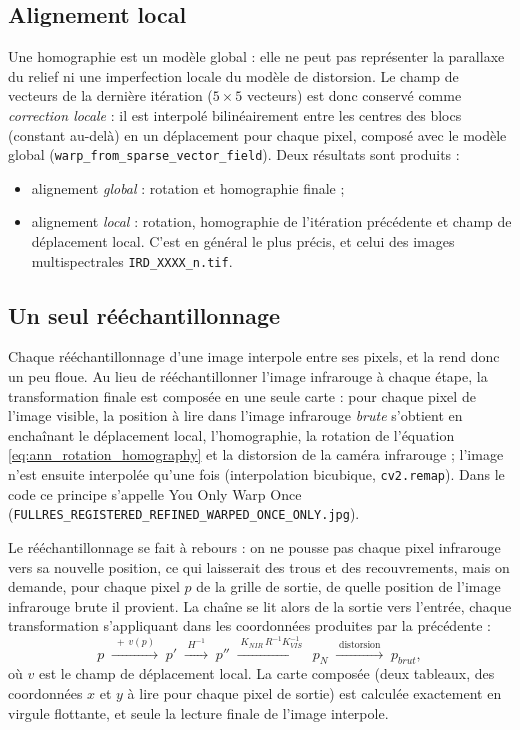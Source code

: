 \documentclass[a4paper,11pt]{report}
\begin{document}
\subsection{Alignement local}\label{sec:ann_local}
Une homographie est un modèle global : elle ne peut pas représenter la parallaxe du relief ni une imperfection locale du modèle de distorsion. Le champ de vecteurs de la dernière itération ($5 \times 5$ vecteurs) est donc conservé comme \emph{correction locale} : il est interpolé bilinéairement entre les centres des blocs (constant au-delà) en un déplacement pour chaque pixel, composé avec le modèle global (\texttt{warp\_from\_sparse\_vector\_field}). Deux résultats sont produits :
\begin{itemize}
	\item alignement \emph{global} : rotation et homographie finale ;
	\item alignement \emph{local} : rotation, homographie de l'itération précédente et champ de déplacement local. C'est en général le plus précis, et celui des images multispectrales \texttt{IRD\_XXXX\_n.tif}.
\end{itemize}

\subsection{Un seul rééchantillonnage}
Chaque rééchantillonnage d'une image interpole entre ses pixels, et la rend donc un peu floue. Au lieu de rééchantillonner l'image infrarouge à chaque étape, la transformation finale est composée en une seule carte : pour chaque pixel de l'image visible, la position à lire dans l'image infrarouge \emph{brute} s'obtient en enchaînant le déplacement local, l'homographie, la rotation de l'équation \eqref{eq:ann_rotation_homography} et la distorsion de la caméra infrarouge ; l'image n'est ensuite interpolée qu'une fois (interpolation bicubique, \texttt{cv2.remap}). Dans le code ce principe s'appelle \og You Only Warp Once \fg{} (\texttt{FULLRES\_REGISTERED\_REFINED\_WARPED\_ONCE\_ONLY.jpg}).

Le rééchantillonnage se fait \og à rebours \fg{} : on ne pousse pas chaque pixel infrarouge vers sa nouvelle position, ce qui laisserait des trous et des recouvrements, mais on demande, pour chaque pixel $p$ de la grille de sortie, de quelle position de l'image infrarouge brute il provient. La chaîne se lit alors de la sortie vers l'entrée, chaque transformation s'appliquant dans les coordonnées produites par la précédente :
\begin{equation}
	p \;\xrightarrow{\;+\,v(p)\;}\; p' \;\xrightarrow{\;H^{-1}\;}\; p'' \;\xrightarrow{\;K_{NIR}\, R^{-1} K_{VIS}^{-1}\;}\; p_N \;\xrightarrow{\;\text{distorsion}\;}\; p_{brut},
\end{equation}
où $v$ est le champ de déplacement local. La carte composée (deux tableaux, des coordonnées $x$ et $y$ à lire pour chaque pixel de sortie) est calculée exactement en virgule flottante, et seule la lecture finale de l'image interpole.
\end{document}
